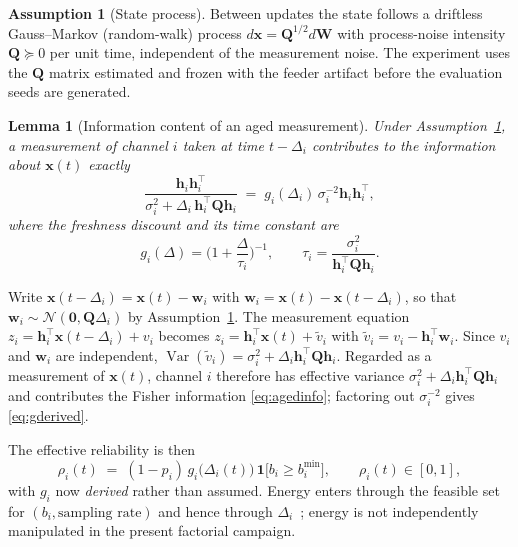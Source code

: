 \documentclass[journal]{IEEEtran}
\theoremstyle{plain}
\newtheorem{lemma}{Lemma}
\theoremstyle{definition}
\newtheorem{assumption}{Assumption}
\theoremstyle{remark}
\newcommand{\bx}{\mathbf{x}}
\newcommand{\bh}{\mathbf{h}}
\newcommand{\bQ}{\mathbf{Q}}
\begin{document}
\begin{assumption}[State process]
\label{as:process}
Between updates the state follows a driftless Gauss--Markov (random-walk)
process $d\bx=\bQ^{1/2}d\mathbf{W}$ with process-noise intensity
$\bQ\succeq0$ per unit time, independent of the measurement noise. The
experiment uses the $\bQ$ matrix estimated and frozen with the feeder
artifact before the evaluation seeds are generated.
\end{assumption}

\begin{lemma}[Information content of an aged measurement]
\label{lem:age}
Under Assumption~\ref{as:process}, a measurement of channel $i$ taken at
time $t-\Delta_i$ contributes to the information about $\bx(t)$ exactly
\begin{equation}
\frac{\bh_i\bh_i^{\top}}{\sigma_i^{2}+\Delta_i\,\bh_i^{\top}\bQ\bh_i}
\;=\;g_i(\Delta_i)\,\sigma_i^{-2}\bh_i\bh_i^{\top},
\label{eq:agedinfo}
\end{equation}
where the freshness discount and its time constant are
\begin{equation}
\boxed{\;g_i(\Delta)=\Big(1+\frac{\Delta}{\tau_i}\Big)^{-1},
\qquad
\tau_i=\frac{\sigma_i^{2}}{\bh_i^{\top}\bQ\bh_i}.\;}
\label{eq:gderived}
\end{equation}
\end{lemma}
\begin{IEEEproof}
Write $\bx(t-\Delta_i)=\bx(t)-\mathbf{w}_i$ with
$\mathbf{w}_i=\bx(t)-\bx(t-\Delta_i)$, so that
$\mathbf{w}_i\sim\mathcal{N}(\mathbf{0},\bQ\Delta_i)$ by
Assumption~\ref{as:process}. The measurement equation
$z_i=\bh_i^{\top}\bx(t-\Delta_i)+v_i$ becomes
$z_i=\bh_i^{\top}\bx(t)+\tilde v_i$ with
$\tilde v_i=v_i-\bh_i^{\top}\mathbf{w}_i$. Since $v_i$ and
$\mathbf{w}_i$ are independent,
$\operatorname{Var}(\tilde v_i)=\sigma_i^{2}+\Delta_i\bh_i^{\top}\bQ\bh_i$.
Regarded as a measurement of $\bx(t)$, channel $i$ therefore has effective
variance $\sigma_i^2+\Delta_i\bh_i^\top\bQ\bh_i$ and contributes the
Fisher information \eqref{eq:agedinfo}; factoring out $\sigma_i^{-2}$
gives \eqref{eq:gderived}.
\end{IEEEproof}

The effective reliability is then
\begin{equation}
\rho_i(t)\;=\;(1-p_i)\,g_i\!\big(\Delta_i(t)\big)\,
\mathbf{1}\!\big[b_i\ge b_i^{\min}\big],\qquad \rho_i(t)\in[0,1],
\label{eq:rho}
\end{equation}
with $g_i$ now \emph{derived} rather than assumed. Energy enters through
the feasible set for $(b_i,\text{sampling rate})$ and hence through
$\Delta_i$~\cite{shi2011}; energy is not independently manipulated in
the present factorial campaign.
\end{document}
